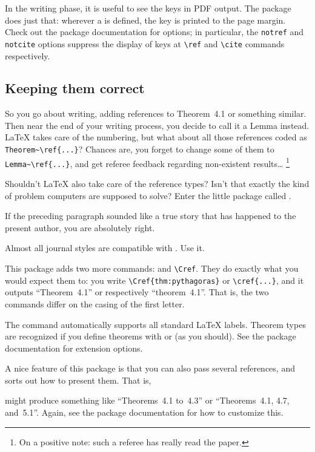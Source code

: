 In the writing phase, it is useful to see the keys in PDF output.
The  package does just that:
wherever a  is defined,
the key is printed to the page margin.
Check out the package documentation for options;
in particular, the \verb|notref| and \verb|notcite| options
suppress the display of keys at \verb|\ref| and \verb|\cite| commands respectively.



%
%
\subsection{Keeping them correct}\label{sec:cleveref}

So you go about writing, adding references to Theorem~4.1 or something similar.
Then near the end of your writing process,
you decide to call it a Lemma instead.
\LaTeX{} takes care of the numbering,
but what about all those references coded as \verb|Theorem~\ref{...}|?
Chances are, you forget to change some of them to \verb|Lemma~\ref{...}|,
and get referee feedback regarding non-existent results\dots%
\footnote{On a positive note: such a referee has really read the paper.}

Shouldn't \LaTeX{} also take care of the reference types?
Isn't that exactly the kind of problem computers are supposed to solve?
Enter the little package called .

\begin{practices}
If the preceding paragraph sounded like a true story that has happened to the present author,
you are absolutely right.

Almost all journal styles are compatible with .
Use it.
\end{practices}

This package adds two more commands:  and \verb|\Cref|.
They do exactly what you would expect them to:
you write \verb|\Cref{thm:pythagoras}| or \verb|\cref{...}|,
and it outputs ``Theorem~4.1'' or respectively ``theorem~4.1''.
That is, the two commands differ on the casing of the first letter.

The command automatically supports all standard \LaTeX{} labels.
Theorem types are recognized if you define theorems with
 or  (as you should).
See the package documentation for extension options.

A nice feature of this package is that you can also pass several references,
and  sorts out how to present them.
That is,
\begin{ExampleCode}
\end{ExampleCode}
might produce something like ``Theorems~4.1 to~4.3''
or ``Theorems~4.1, 4.7, and~5.1''.
Again, see the package documentation for how to customize this.

